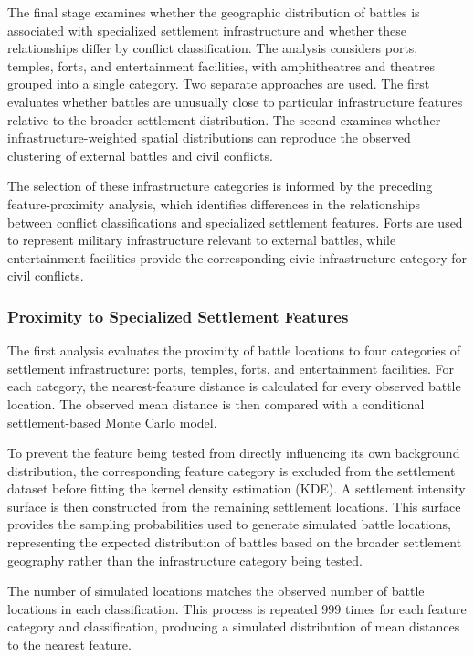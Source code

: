 \documentclass[
  letterpaper,
  DIV=11,
  numbers=noendperiod]{scrartcl}
\begin{document}
The final stage examines whether the geographic distribution of battles
is associated with specialized settlement infrastructure and whether
these relationships differ by conflict classification. The analysis
considers ports, temples, forts, and entertainment facilities, with
amphitheatres and theatres grouped into a single category. Two separate
approaches are used. The first evaluates whether battles are unusually
close to particular infrastructure features relative to the broader
settlement distribution. The second examines whether
infrastructure-weighted spatial distributions can reproduce the observed
clustering of external battles and civil conflicts.

The selection of these infrastructure categories is informed by the
preceding feature-proximity analysis, which identifies differences in
the relationships between conflict classifications and specialized
settlement features. Forts are used to represent military infrastructure
relevant to external battles, while entertainment facilities provide the
corresponding civic infrastructure category for civil conflicts.

\subsubsection{Proximity to Specialized Settlement
Features}\label{proximity-to-specialized-settlement-features}

The first analysis evaluates the proximity of battle locations to four
categories of settlement infrastructure: ports, temples, forts, and
entertainment facilities. For each category, the nearest-feature
distance is calculated for every observed battle location. The observed
mean distance is then compared with a conditional settlement-based Monte
Carlo model.

To prevent the feature being tested from directly influencing its own
background distribution, the corresponding feature category is excluded
from the settlement dataset before fitting the kernel density estimation
(KDE). A settlement intensity surface is then constructed from the
remaining settlement locations. This surface provides the sampling
probabilities used to generate simulated battle locations, representing
the expected distribution of battles based on the broader settlement
geography rather than the infrastructure category being tested.

The number of simulated locations matches the observed number of battle
locations in each classification. This process is repeated 999 times for
each feature category and classification, producing a simulated
distribution of mean distances to the nearest feature.
\end{document}
